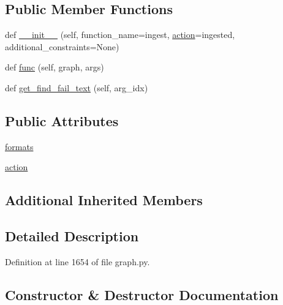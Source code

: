\subsection*{Public Member Functions}
\begin{DoxyCompactItemize}
\item 
def \hyperlink{classlight__chats_1_1graph_1_1IngestFunction_ad4e544e64b77af820462e71260a067d5}{\+\_\+\+\_\+init\+\_\+\+\_\+} (self, function\+\_\+name=\textquotesingle{}ingest\textquotesingle{}, \hyperlink{classlight__chats_1_1graph_1_1IngestFunction_a622f30ce7ef9f3c210c1881eab7c2744}{action}=\textquotesingle{}ingested\textquotesingle{}, additional\+\_\+constraints=None)
\item 
def \hyperlink{classlight__chats_1_1graph_1_1IngestFunction_acf3afc20e4e55a9bd2783d2bad592a88}{func} (self, graph, args)
\item 
def \hyperlink{classlight__chats_1_1graph_1_1IngestFunction_aae6cb9fc171d5a59c3d2bafae9ed58b7}{get\+\_\+find\+\_\+fail\+\_\+text} (self, arg\+\_\+idx)
\end{DoxyCompactItemize}
\subsection*{Public Attributes}
\begin{DoxyCompactItemize}
\item 
\hyperlink{classlight__chats_1_1graph_1_1IngestFunction_af639522820335d377bf31825afe21584}{formats}
\item 
\hyperlink{classlight__chats_1_1graph_1_1IngestFunction_a622f30ce7ef9f3c210c1881eab7c2744}{action}
\end{DoxyCompactItemize}
\subsection*{Additional Inherited Members}


\subsection{Detailed Description}
\begin{DoxyVerb}\end{DoxyVerb}
 

Definition at line 1654 of file graph.\+py.



\subsection{Constructor \& Destructor Documentation}
\mbox{\label{classlight__chats_1_1graph_1_1IngestFunction_ad4e544e64b77af820462e71260a067d5}} 

